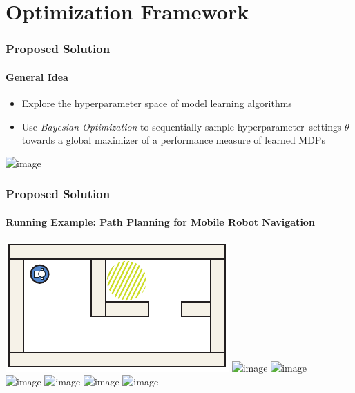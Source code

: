 \section{Optimization Framework}

\begin{frame}[t]
\frametitle{Proposed Solution}
\framesubtitle{General Idea}

\begin{itemize}
	\item<1-> Explore the hyperparameter space of model learning algorithms
	\item<2-> Use \textit{Bayesian Optimization} to sequentially sample hyperparameter~settings $\theta$ towards a global maximizer of a performance measure of learned MDPs
\end{itemize}

\begin{center}
	\includegraphics<3->[width=\textwidth]{figures/bo_toy_example_two_iterations}
\end{center}

\end{frame}

\begin{frame}
\frametitle{Proposed Solution}
\framesubtitle{Running Example: Path Planning for Mobile Robot Navigation}

\centering
\includegraphics[width=.3\textwidth]{figures/dummy-map-2-1}
\qquad
\includegraphics<-1| handout:0>[width=.3\textwidth]{figures/dummy-map-2-2-transparent}
\includegraphics<2->[width=.3\textwidth]{figures/dummy-map-2-2v2}\\\vspace{8pt}
\includegraphics<-2| handout:0>[width=.3\textwidth]{figures/dummy-map-2-3-transparent}
\includegraphics<3->[width=.3\textwidth]{figures/dummy-map-2-3} \qquad
\includegraphics<-3| handout:0>[width=.3\textwidth]{figures/dummy-map-2-4-transparent} \includegraphics<4->[width=.3\textwidth]{figures/dummy-map-2-4}


\end{frame}

